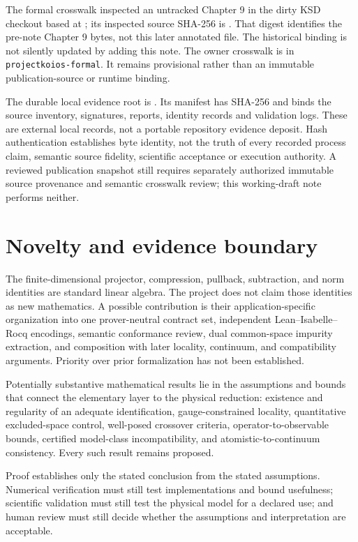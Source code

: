 The formal crosswalk inspected an untracked Chapter 9 in the dirty KSD
checkout based at ; its
inspected source SHA-256 is
.
That digest identifies the pre-note Chapter 9 bytes, not this later annotated
file. The historical binding is not silently updated by adding this note.
The owner crosswalk is
in \texttt{projectkoios-formal}. It remains provisional rather than an
immutable publication-source or runtime binding.

The durable local evidence root is
.
Its  manifest has SHA-256
and binds the source inventory, signatures, reports, identity records and
validation logs. These are external local records, not a portable repository
evidence deposit. Hash authentication establishes byte identity, not the
truth of every recorded process claim, semantic source fidelity, scientific
acceptance or execution authority. A reviewed publication snapshot still
requires separately authorized immutable source provenance and semantic
crosswalk review; this working-draft note performs neither.

\section{Novelty and evidence boundary}


The finite-dimensional projector, compression, pullback, subtraction, and norm
identities are standard linear algebra. The project does not claim those
identities as new mathematics. A possible contribution is their
application-specific organization into one prover-neutral contract set,
independent Lean--Isabelle--Rocq encodings, semantic conformance review, dual
common-space impurity extraction, and composition with later locality,
continuum, and compatibility arguments. Priority over prior formalization has
not been established.

Potentially substantive mathematical results lie in the assumptions and bounds
that connect the elementary layer to the physical reduction: existence and
regularity of an adequate identification, gauge-constrained locality,
quantitative excluded-space control, well-posed crossover criteria,
operator-to-observable bounds, certified model-class incompatibility, and
atomistic-to-continuum consistency. Every such result remains proposed.

Proof establishes only the stated conclusion from the stated assumptions.
Numerical verification must still test implementations and bound usefulness;
scientific validation must still test the physical model for a declared use;
and human review must still decide whether the assumptions and interpretation
are acceptable.
